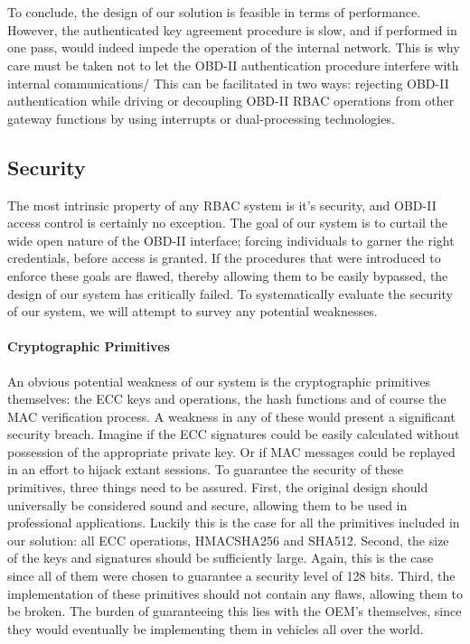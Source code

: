 \\ \\ To conclude, the design of our solution is feasible in terms of performance. However, the authenticated key agreement procedure is slow, and if performed in one pass, would indeed impede the operation of the internal network. This is why care must be taken not to let the OBD-II authentication procedure interfere with internal communications/ This can be facilitated in two ways: rejecting OBD-II authentication while driving or decoupling OBD-II RBAC operations from other gateway functions by using interrupts or dual-processing technologies. 


\subsection{Security}
\label{sec:security}

The most intrinsic property of any RBAC system is it's security, and OBD-II access control is certainly no exception. The goal of our system is to curtail the wide open nature of the OBD-II interface; forcing individuals to garner the right credentials, before access is granted. If the procedures that were introduced to enforce these goals are flawed, thereby allowing them to be easily bypassed, the design of our system has critically failed. To systematically evaluate the security of our system, we will attempt to survey any potential weaknesses.


\paragraph{Cryptographic Primitives} An obvious potential weakness of our system is the cryptographic primitives themselves: the ECC keys and operations, the hash functions and of course the MAC verification process. A weakness in any of these would present a significant security breach. Imagine if the ECC signatures could be easily calculated without possession of the appropriate private key. Or if MAC messages could be replayed in an effort to hijack extant sessions. To guarantee the security of these primitives, three things need to be assured. First, the original design should universally be considered sound and secure, allowing them to be used in professional applications. Luckily this is the case for all the primitives included in our solution: all ECC operations, HMAC\textunderscore SHA256 and SHA512. Second, the size of the keys and signatures should be sufficiently large. Again, this is the case since all of them were chosen to guarantee a security level of 128 bits. Third, the implementation of these primitives should not contain any flaws, allowing them to be broken. The burden of guaranteeing this lies with the OEM's themselves, since they would eventually be implementing them in vehicles all over the world. 

